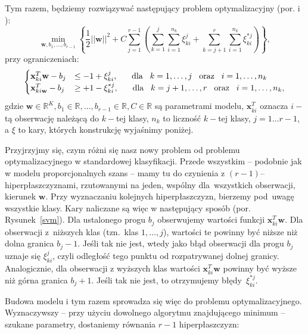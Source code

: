 \documentclass{mini}
\begin{document}
Tym razem, będziemy rozwiązywać następujący problem optymalizacyjny (por. \cite{pom} i \cite{svm}):
$$
\min_{\textbf{w}, b_1, \ldots, b_{r-1}}\left\lbrace \dfrac{1}{2}||\textbf{w}||^2+C\sum_{j=1}^{r-1}\left( \sum_{k=1}^{j}\sum_{i=1}^{n_k}\xi_{ki}^j+\sum_{k=j+1}^{r}\sum_{i=1}^{n_k}\xi_{ki}^{*j}\right)\right\rbrace,
$$
przy ograniczeniach:
$$
\begin{cases}
\mathbf{x}^T_{ki}\textbf{w}-b_j&\leq -1 +\xi^j_{ki}, \hspace{6mm} \textrm{dla}\hspace{3mm} k=1,\ldots,j \hspace{3mm}\textrm{oraz}\hspace{3mm} i=1,\ldots,n_k \\
\mathbf{x}^T_{ki\textbf{w}}-b_j&\geq +1 -\xi^{*j}_{ki}, \hspace{6mm} \textrm{dla}\hspace{3mm} k=j+1,\ldots,r \hspace{3mm}\textrm{oraz}\hspace{3mm} i=1,\ldots,n_k, 
\end{cases}
$$
gdzie $\textbf{w}\in \mathbb{R}^K, b_1\in\mathbb{R}, \ldots, b_{r-1}\in\mathbb{R}, C\in\mathbb{R}$ są parametrami modelu, $\mathbf{x}^T_{ki}$ oznacza $i-$tą obserwację należącą do $k-$tej klasy, $n_k$ to liczność $k-$tej klasy, $j=1\ldots r-1$, a $\xi$ to kary, których konstrukcję wyjaśnimy poniżej.

Przyjrzyjmy się, czym różni się nasz nowy problem od problemu optymalizacyjnego w standardowej klasyfikacji. Przede wszystkim -- podobnie jak w modelu proporcjonalnych szans -- mamy tu do czynienia z $(r-1)$--hiperpłaszczyznami, rzutowanymi na jeden, wspólny dla~wszystkich obserwacji, kierunek $\mathbf{w}$. Przy wyznaczaniu kolejnych hiperpłaszczyzn, bierzemy pod~uwagę wszystkie klasy. Kary naliczane są więc w następujący sposób (por. Rysunek~\ref{svm}). Dla ustalonego progu $b_j$ obserwujemy wartości funkcji $\mathbf{x}_{ki}^T\textbf{w}$. Dla obserwacji z~niższych klas (tzn.~klas $1,\ldots, j$), wartości te powinny być niższe niż dolna granica $b_j-1$. Jeśli tak nie jest, wtedy jako błąd obserwacji dla progu $b_j$ uznaje się $\xi^j_{ki}$, czyli odległość tego punktu od rozpatrywanej dolnej granicy. Analogicznie, dla obserwacji z wyższych klas wartości $\mathbf{x}_{ki}^T\textbf{w}$ powinny być wyższe niż górna granica $b_j+1$. Jeśli tak nie jest, to otrzymujemy błędy~$\xi^{*j}_{ki}$.

Budowa modelu i tym razem sprowadza się więc do problemu optymalizacyjnego. Wyznaczywszy -- przy użyciu dowolnego algorytmu znajdującego minimum -- szukane parametry, dostaniemy równania $r-1$ hiperpłaszczyzn:
\end{document}
